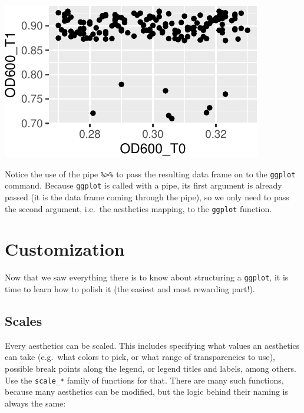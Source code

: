 \documentclass[]{book}
\begin{document}
\begin{center}\includegraphics[width=\textwidth]{TRES-Tidy-Tutorial_files/figure-latex/unnamed-chunk-138-1} \end{center}

Notice the use of the pipe \texttt{\%\textgreater{}\%} to pass the resulting data frame on to the \texttt{ggplot} command. Because \texttt{ggplot} is called with a pipe, its first argument is already passed (it is the data frame coming through the pipe), so we only need to pass the second argument, i.e.~the aesthetics mapping, to the \texttt{ggplot} function.

\hypertarget{customization}{%
\section{Customization}\label{customization}}

Now that we saw everything there is to know about structuring a \texttt{ggplot}, it is time to learn how to polish it (the easiest and most rewarding part!).

\hypertarget{scales}{%
\subsection{Scales}\label{scales}}

Every aesthetics can be scaled. This includes specifying what values an aesthetics can take (e.g.~what colors to pick, or what range of transparencies to use), possible break points along the legend, or legend titles and labels, among others. Use the \texttt{scale\_*} family of functions for that. There are many such functions, because many aesthetics can be modified, but the logic behind their naming is always the same:
\end{document}
